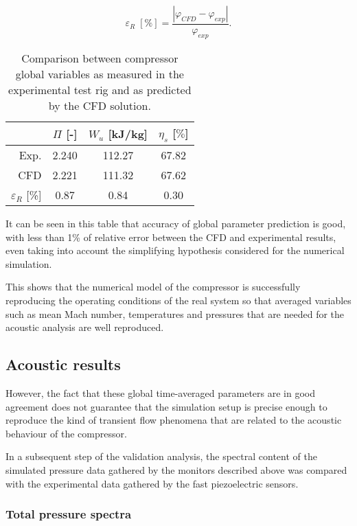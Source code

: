 \begin{equation}\label{eq:relative_error_cfd}
	\varepsilon_R\;[\%]=\frac{\left| \varphi_{CFD}-\varphi_{exp} \right|}{\varphi_{exp}}.
\end{equation}

\begin{table}[htb]
\centering
\caption{Comparison between compressor global variables as measured in the experimental test rig and as predicted by the CFD solution.}
\footnotesize
	\begin{tabular}{rccc}
	\toprule
	 & $\varPi$ [-] & $W_u$ [kJ/kg] & $\eta_s$ [$\%$] \\\midrule
	Exp. & 2.240 & 112.27 & 67.82  \\
	CFD & 2.221 & 111.32 & 67.62  \\\midrule
	$\varepsilon_R$ [\%] & 0.87 & 0.84 & 0.30  \\ \bottomrule
	\end{tabular}
\label{tab:cfd_globalVariables}
\end{table}

It can be seen in this table that accuracy of global parameter prediction is good, with less than 1\% of relative error between the CFD and experimental results, even taking into account the simplifying hypothesis considered for the numerical simulation.

This shows that the numerical model of the compressor is successfully reproducing the operating conditions of the real system so that averaged variables such as mean Mach number, temperatures and pressures that are needed for the acoustic analysis are well reproduced.

\subsection{Acoustic results}

However, the fact that these global time-averaged parameters are in good agreement does not guarantee that the simulation setup is precise enough to reproduce the kind of transient flow phenomena that are related to the acoustic behaviour of the compressor.

In a subsequent step of the validation analysis, the spectral content of the simulated pressure data gathered by the monitors described above was compared with the experimental data gathered by the fast piezoelectric sensors.

\subsubsection{Total pressure spectra}

